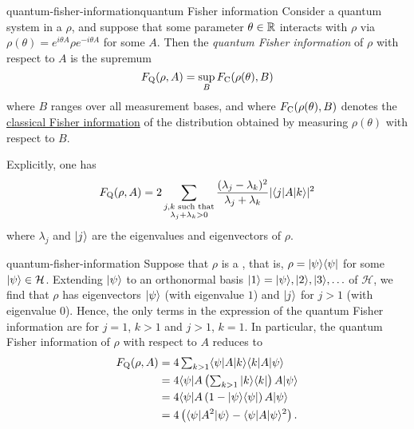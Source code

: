 \begin{topic}{quantum-fisher-information}{quantum Fisher information}
    Consider a quantum system in a  $\rho$, and suppose that some parameter $\theta \in \mathbb{R}$ interacts with $\rho$ via $\rho(\theta) = e^{i \theta A} \rho e^{- i \theta A}$ for some  $A$. Then the \emph{quantum Fisher information} of $\rho$ with respect to $A$ is the supremum
    \[ F_\textup{Q}(\rho, A) = \sup_{B} F_\textup{C}(\rho(\theta), B) \]
    where $B$ ranges over all measurement bases, and where $F_\textup{C}(\rho(\theta), B)$ denotes the \href{/math-definitions#PT:fisher-information}{classical Fisher information} of the distribution obtained by measuring $\rho(\theta)$ with respect to $B$.
    
    Explicitly, one has
    \[ F_\textup{Q}(\rho, A) = 2 \sum_{\substack{j, k \textup{ such that} \\ \lambda_j + \lambda_k > 0}} \frac{(\lambda_j - \lambda_k)^2}{\lambda_j + \lambda_k} |\langle j| A |k\rangle|^2 \]
    where $\lambda_j$ and $|j\rangle$ are the eigenvalues and eigenvectors of $\rho$.
\end{topic}

\begin{example}{quantum-fisher-information}
    Suppose that $\rho$ is a , that is, $\rho = |\psi\rangle \langle\psi|$ for some $|\psi\rangle \in \mathcal{H}$. Extending $|\psi\rangle$ to an orthonormal basis $|1\rangle = |\psi\rangle, |2\rangle, |3\rangle, \ldots$ of $\mathcal{H}$, we find that $\rho$ has eigenvectors $|\psi\rangle$ (with eigenvalue $1$) and $|j\rangle$ for $j > 1$ (with eigenvalue $0$). Hence, the only terms in the expression of the quantum Fisher information are for $j = 1$, $k > 1$ and $j > 1$, $k = 1$. In particular, the quantum Fisher information of $\rho$ with respect to $A$ reduces to
    \[ \begin{aligned}
        F_\textup{Q}(\rho, A)
            &= 4 \textstyle \sum_{k > 1} \langle\psi| A |k\rangle \langle k| A |\psi\rangle \\
            &= 4 \langle\psi| A \left( \textstyle \sum_{k > 1} |k\rangle \langle k| \right) A |\psi\rangle \\
            &= 4 \langle\psi| A \left( 1 - |\psi\rangle \langle\psi| \right) A |\psi\rangle \\
            &= 4 \left( \langle\psi| A^2 |\psi\rangle - \langle\psi| A |\psi\rangle^2 \right) .
    \end{aligned} \]
\end{example}


